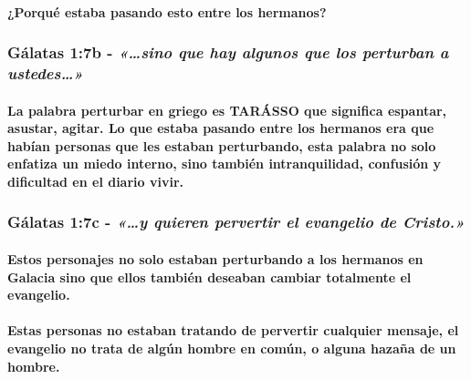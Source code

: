 \documentclass[11a pt,twoside]{article}
\newcommand{\scripture}[1]{%
  {\fontsize{12pt}{16pt}\selectfont\ScriptureFont\itshape #1}%
}
\let\oldsubsubsection\subsubsection
\renewcommand{\subsubsection}{\needspace{4\baselineskip}\oldsubsubsection}
\let\oldparagraph\paragraph
\renewcommand{\paragraph}{\needspace{3\baselineskip}\oldparagraph}
\begin{document}
\paragraph{¿Porqué estaba pasando esto entre los
hermanos?}\label{porquuxe9-estaba-pasando-esto-entre-los-hermanos}

\subsubsection{\texorpdfstring{Gálatas 1:7b -
\scripture{«…sino que hay algunos que los perturban a ustedes…»}}{Gálatas 1:7b - }}\label{guxe1latas-17b---sino-que-hay-algunos-que-los-perturban-a-ustedes}

\paragraph{La palabra perturbar en griego es TARÁSSO que significa
espantar, asustar, agitar. Lo que estaba pasando entre los hermanos era
que habían personas que les estaban perturbando, esta palabra no solo
enfatiza un miedo interno, sino también intranquilidad, confusión y
dificultad en el diario
vivir.}\label{la-palabra-perturbar-en-griego-es-taruxe1sso-que-significa-espantar-asustar-agitar.-lo-que-estaba-pasando-entre-los-hermanos-era-que-habuxedan-personas-que-les-estaban-perturbando-esta-palabra-no-solo-enfatiza-un-miedo-interno-sino-tambiuxe9n-intranquilidad-confusiuxf3n-y-dificultad-en-el-diario-vivir.}

\subsubsection{\texorpdfstring{Gálatas 1:7c -
\scripture{«…y quieren pervertir el evangelio de Cristo.»}}{Gálatas 1:7c - }}\label{guxe1latas-17c---y-quieren-pervertir-el-evangelio-de-cristo.}

\paragraph{Estos personajes no solo estaban perturbando a los hermanos
en Galacia sino que ellos también deseaban cambiar totalmente el
evangelio.}\label{estos-personajes-no-solo-estaban-perturbando-a-los-hermanos-en-galacia-sino-que-ellos-tambiuxe9n-deseaban-cambiar-totalmente-el-evangelio.}

\paragraph{Estas personas no estaban tratando de pervertir cualquier
mensaje, el evangelio no trata de algún hombre en común, o alguna hazaña
de un
hombre.}\label{estas-personas-no-estaban-tratando-de-pervertir-cualquier-mensaje-el-evangelio-no-trata-de-alguxfan-hombre-en-comuxfan-o-alguna-hazauxf1a-de-un-hombre.}
\end{document}
